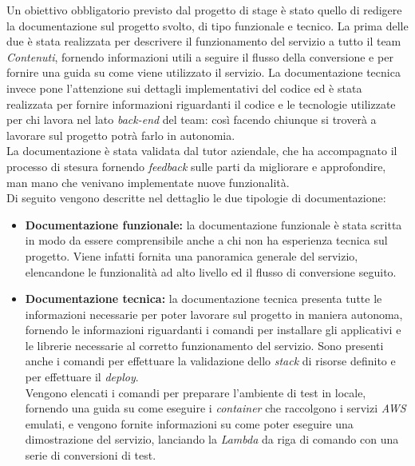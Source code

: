 Un obiettivo obbligatorio previsto dal progetto di stage è stato quello di redigere la
documentazione sul progetto svolto, di tipo funzionale e tecnico. La prima delle
due è stata realizzata per descrivere il funzionamento del servizio a tutto il
team \emph{Contenuti}, fornendo informazioni utili a seguire il flusso della
conversione e per fornire una guida su come viene utilizzato il servizio. La documentazione tecnica invece pone l'attenzione sui dettagli
implementativi del codice ed è stata realizzata per fornire informazioni
riguardanti il codice e le tecnologie utilizzate per chi lavora nel lato \emph{back-end} del team: così facendo chiunque si troverà a
lavorare sul progetto potrà farlo in autonomia.\\
La documentazione è stata validata dal tutor aziendale, che ha accompagnato il
processo di stesura fornendo \emph{feedback} sulle parti da migliorare e
approfondire, man mano che venivano implementate nuove funzionalità. \\
Di seguito vengono descritte nel dettaglio le due tipologie di documentazione:
\begin{itemize}
    \item \textbf{Documentazione funzionale:} la documentazione funzionale è
          stata scritta in modo da essere comprensibile anche a chi non ha esperienza
          tecnica sul progetto. Viene infatti fornita una panoramica generale del
          servizio, elencandone le funzionalità ad alto livello ed il flusso di
          conversione seguito.
    \item \textbf{Documentazione tecnica:} la documentazione tecnica presenta
          tutte le informazioni necessarie per poter lavorare sul progetto in
          maniera autonoma, fornendo le informazioni riguardanti i comandi per
          installare gli applicativi e le librerie necessarie al corretto
          funzionamento del servizio. Sono presenti anche i comandi per
          effettuare la validazione dello \emph{stack} di risorse definito e per
          effettuare il \emph{deploy}. \\
          Vengono elencati i comandi per preparare l'ambiente di test in
          locale, fornendo una guida su come eseguire i \emph{container} che
          raccolgono i servizi \emph{AWS} emulati, e vengono fornite
          informazioni su come poter eseguire una dimostrazione del servizio,
          lanciando la \emph{Lambda} da riga di comando con una serie di
          conversioni di test.
\end{itemize}

